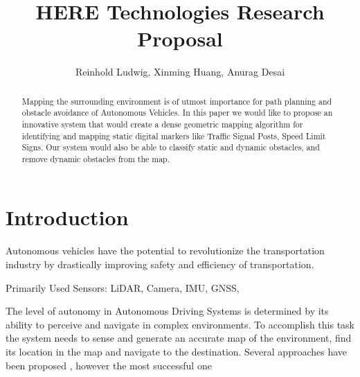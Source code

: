 \documentclass{article}
\title{HERE Technologies Research Proposal}
\author{Reinhold Ludwig, Xinming Huang, Anurag Desai}
\begin{document}
	\maketitle
	\newpage
		
	\begin{abstract}
		Mapping the surrounding environment is of utmost importance for path planning and obstacle avoidance of Autonomous Vehicles. In this paper we would like to propose an innovative system that would create a dense geometric mapping algorithm for identifying and mapping static digital markers like Traffic Signal Posts, Speed Limit Signs. Our system would also be able to classify static and dynamic obstacles, and remove dynamic obstacles from the map. 
	\end{abstract}
	
	\section{Introduction}
	\paragraph{}
	Autonomous vehicles have the potential to revolutionize the transportation industry by drastically improving safety and efficiency of transportation. 
	
	Primarily Used Sensors: LiDAR, Camera, IMU, GNSS, 
	
	The level of autonomy in Autonomous Driving Systems is determined by its ability to perceive and navigate in complex environments. To accomplish this task the system needs to sense and generate an accurate map of the environment, find its location in the map and navigate to the destination. Several approaches have been proposed 
	\cite{Thrun_Montemerlo_2006} 
	\cite{Durrant-Whyte_Bailey}
	,
	however the most successful one
	\cite{Levinson_Montemerlo_Thrun_2007}
	

	\begin{comment}
	Autonomous vehicles require more information that the standard 2D map provides. It needs to understand when and where to look for traffic signals, speed limits. Even to perform a simple task like taking a turn, the autonomous vehicle requires information like where the turn only lane starts which isn't provided in standard maps. Hence we need maps that have more data that simple latitude and longitudinal data.
	Perception and navigation in complex environment requires a well defined map of the environment. LiDAR is usually used to generate a map of the environment using the 3D point cloud data. Camera's do not directly provide a depth perception but can be extremely efficient in image classification and obstacle detection.
	\end{comment}
	
\end{document}
